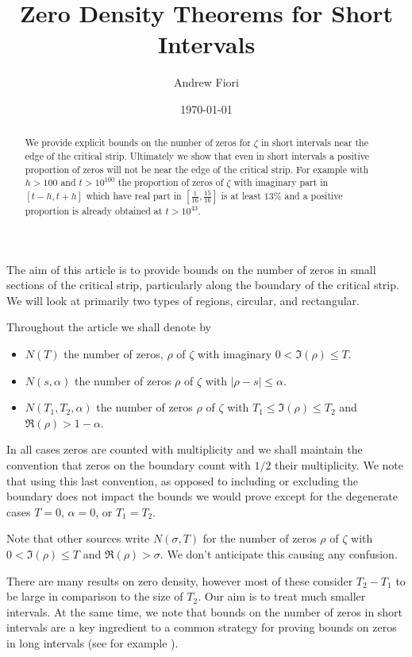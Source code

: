 \documentclass[10pt,english,letter, reqno]{amsart}
\author[A. Fiori]{Andrew Fiori}
\title{Zero Density Theorems for Short Intervals}
\date{\today}                                           %
\theoremstyle{plain}
\theoremstyle{definition}
\begin{document}
\begin{abstract}
 We provide explicit bounds on the number of zeros for $\zeta$ in short intervals near the edge of the critical strip.
 Ultimately we show that even in short intervals a positive proportion of zeros will not be near the edge of the critical strip.
 For example with $h>100$ and $t>10^{100}$ the proportion of zeros of $\zeta$ with imaginary part in $[t-h,t+h]$ which have real part in $[\frac{1}{16},\frac{15}{16}]$ is at least $13\%$ and a positive proportion is already obtained at $t>10^{43}$.
\end{abstract}

\maketitle

The aim of this article is to provide bounds on the number of zeros in small sections of the critical strip, particularly along the boundary of the critical strip. We will look at primarily two types of regions, circular, and rectangular.


Throughout the article we shall denote by
\begin{itemize}
    \item $N(T)$ the number of zeros, $\rho$ of $\zeta$ with imaginary $0 < \Im(\rho) \leq T$.
    \item $N(s,\alpha)$ the number of zeros $\rho$ of $\zeta$ with $|\rho-s|\leq \alpha$.
    \item $N(T_1,T_2,\alpha)$ the number of zeros $\rho$ of $\zeta$ with $T_1 \leq \Im(\rho) \leq T_2$
    and $\Re(\rho)>1-\alpha$.
\end{itemize}
In all cases zeros are counted with multiplicity and we shall maintain the convention that zeros on the boundary count with $1/2$ their multiplicity. We note that using this last convention, as opposed to including or excluding the boundary does not impact the bounds we would prove except for the degenerate cases $T=0$, $\alpha=0$, or $T_1=T_2$.

Note that other sources write $N(\sigma,T)$ for  the number of zeros $\rho$ of $\zeta$ with $0 < \Im(\rho) \leq T$ and $\Re(\rho)>\sigma$. We don't anticipate this causing any confusion.

There are many results on zero density, however most of these consider $T_2-T_1$ to be large in comparison to the size of $T_2$. Our aim is to treat much smaller intervals. At the same time, we note that bounds on the number of zeros in short intervals are a key ingredient to a common strategy for proving bounds on zeros in long intervals (see for example \cite{Bellotti2025}). 
\end{document}
